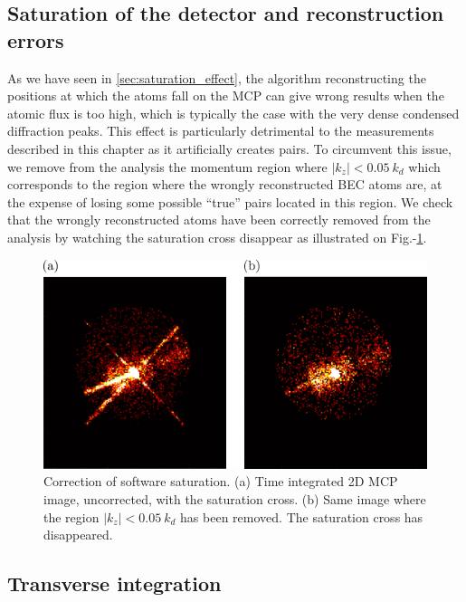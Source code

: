 \subsection{Saturation of the detector and reconstruction errors}

As we have seen in \ref{sec:saturation_effect}, the algorithm reconstructing the positions at which the atoms fall on the MCP can give wrong results when the atomic flux is too high, which is typically the case with the very dense condensed diffraction peaks. This effect is particularly detrimental to the measurements described in this chapter as it artificially creates \kmk pairs. To circumvent this issue, we remove from the analysis the momentum region where $|k_z| < 0.05 \ k_d$ which corresponds to the region where the wrongly reconstructed BEC atoms are, at the expense of losing some possible ``true'' pairs located in this region. We check that the wrongly reconstructed atoms have been correctly removed from the analysis by watching the saturation cross disappear as illustrated on Fig.-\ref{fig:saturation_correction}.

\begin{figure}
    \centering
    \includegraphics[width=\textwidth]{Fig/Chapter4/correction_saturation.png}
    \caption[Correction of software saturation]{Correction of software saturation. (a) Time integrated 2D MCP image, uncorrected, with the saturation cross. (b) Same image where the region $|k_z| < 0.05 \ k_d$ has been removed. The saturation cross has disappeared.}
    \label{fig:saturation_correction}
\end{figure}



\subsection{Transverse integration}

